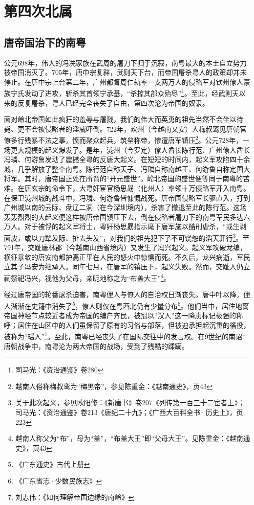 \chapter{第四次北属}

\section{唐帝国治下的南粤}

公元698年，伟大的冯冼家族在武周的屠刀下归于沉寂，南粤最大的本土自立势力被帝国消灭了。705年，唐中宗复辟，武则天下台，而帝国屠杀粤人的政策却并未停止。在唐中宗上台第二年，广州都督周仁轨率一支两万人的侵略军对钦州僚人豪族宁氏发动了进攻，斩杀其首领宁承基，“杀掠其部众殆尽”\footnote{司马光：《资治通鉴》卷280}。至此，经武则天以来的反复屠杀，粤人已经完全丧失了自由，第四次沦为帝国的奴隶。

面对岭北帝国如此疯狂的羞辱与屠戮，我们的伟大而英勇的祖先当然不会坐以待毙、更不会被侵略者的淫威吓倒。722年，欢州（今越南乂安）人梅叔鸾见唐朝官僚多行残暴不法之事，愤而聚众起兵，筑垒称帝，惨遭唐军镇压\footnote{越南人俗称梅叔鸾为“梅黑帝”，参见陈重金：《越南通史》，页43}。公元728年，一场更大规模的起义爆发了。是年，泷州（今罗定）僚人酋长陈行范、广州僚人酋长冯璘、何游鲁发动了震撼全粤的反唐大起义。在短短的时间内，起义军攻陷四十余城，几乎解放了整个南粤。陈行范自称天子、冯璘自称南越王、何游鲁自称定国大将军。其时，唐帝国正处在所谓的“开元盛世”。岭北帝国的盛世便等同于南粤的苦难。在唐玄宗的命令下，大粤奸宦官杨思勗（化州人）率领十万侵略军开入南粤。在保卫泷州城的战斗中，冯璘、何游鲁皆慷慨战死。唐帝国侵略军长驱直入，打到广州城以南的云际、盘辽二洞（在今深圳境内），杀害了撤退至此的陈行范。这场轰轰烈烈的大起义便这样被唐帝国镇压下去，倒在侵略者屠刀下的南粤军民多达六万人。对于被俘的起义军将士，粤奸杨思勗指示麾下唐军施以酷刑虐杀，“或生剥面皮，或以刀犁发际、扯去头发”，对我们的祖先犯下了不可饶恕的滔天罪行\footnote{关于此次起义，参见欧阳修：《新唐书》卷207《列传第一百三十二宦者上》；司马光：《资治通鉴》卷213《唐纪二十九》；《广西大百科全书·历史上》，页223}。至791年，交趾唐林郡（今越南山西省境内）又发生了冯兴起义。起义军攻破龙编，横征暴敛的唐安南都护高正平在人民的怒火中惊惧而死。不久后，龙兴病逝，军民立其子冯安为继承人。同年七月，在唐军的镇压下，起义失败。然而，交趾人仍立祠祭祀冯兴，视他为父母，亲昵地称之为“布盖大王”\footnote{越南人称父为“布”，母为“盖”，“布盖大王”即“父母大王”。见陈重金：《越南通史》，页43}。

经过唐帝国的轮番屠杀迫害，南粤俚人与僚人的自治权日渐丧失。唐中叶以降，俚人渐渐在史籍中消失了\footnote{《广东通史》古代上册}，僚人则仅在粤西北仍有少量分布\footnote{《广东省志·少数民族志》}。他们当中，居住地离帝国神经节点较近者成为帝国的编户齐民，被冠以“汉人”这一降虏标记极强的称呼；居住在山区中的人们虽保留了原有的习俗与部落，但被迫承担起沉重的徭役，被称为“瑶人”\footnote{刘志伟：《如何理解帝国边缘的南岭》}。至此，南粤已经丧失了在国际交往中的发言权。在9世纪的南诏*唐朝战争中，南粤沦为两大帝国的战场，受到了残酷的蹂躏。

